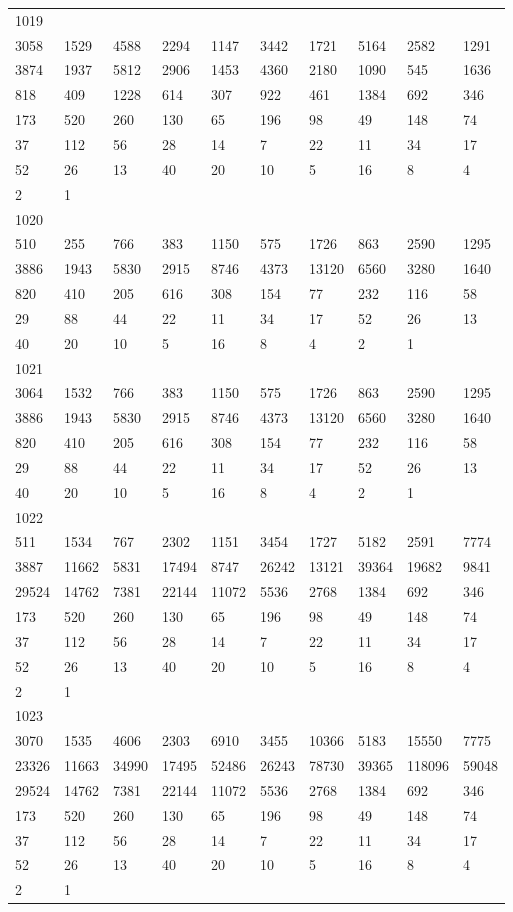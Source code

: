 \begin{longtable}{*{10}{l}}
1019&&&&&&&&&\\
3058& 1529& 4588& 2294& 1147& 3442& 1721& 5164& 2582& 1291\\
3874& 1937& 5812& 2906& 1453& 4360& 2180& 1090& 545& 1636\\
818& 409& 1228& 614& 307& 922& 461& 1384& 692& 346\\
173& 520& 260& 130& 65& 196& 98& 49& 148& 74\\
37& 112& 56& 28& 14& 7& 22& 11& 34& 17\\
52& 26& 13& 40& 20& 10& 5& 16& 8& 4\\
2& 1& \\

1020&&&&&&&&&\\
510& 255& 766& 383& 1150& 575& 1726& 863& 2590& 1295\\
3886& 1943& 5830& 2915& 8746& 4373& 13120& 6560& 3280& 1640\\
820& 410& 205& 616& 308& 154& 77& 232& 116& 58\\
29& 88& 44& 22& 11& 34& 17& 52& 26& 13\\
40& 20& 10& 5& 16& 8& 4& 2& 1& \\

1021&&&&&&&&&\\
3064& 1532& 766& 383& 1150& 575& 1726& 863& 2590& 1295\\
3886& 1943& 5830& 2915& 8746& 4373& 13120& 6560& 3280& 1640\\
820& 410& 205& 616& 308& 154& 77& 232& 116& 58\\
29& 88& 44& 22& 11& 34& 17& 52& 26& 13\\
40& 20& 10& 5& 16& 8& 4& 2& 1& \\

1022&&&&&&&&&\\
511& 1534& 767& 2302& 1151& 3454& 1727& 5182& 2591& 7774\\
3887& 11662& 5831& 17494& 8747& 26242& 13121& 39364& 19682& 9841\\
29524& 14762& 7381& 22144& 11072& 5536& 2768& 1384& 692& 346\\
173& 520& 260& 130& 65& 196& 98& 49& 148& 74\\
37& 112& 56& 28& 14& 7& 22& 11& 34& 17\\
52& 26& 13& 40& 20& 10& 5& 16& 8& 4\\
2& 1& \\

1023&&&&&&&&&\\
3070& 1535& 4606& 2303& 6910& 3455& 10366& 5183& 15550& 7775\\
23326& 11663& 34990& 17495& 52486& 26243& 78730& 39365& 118096& 59048\\
29524& 14762& 7381& 22144& 11072& 5536& 2768& 1384& 692& 346\\
173& 520& 260& 130& 65& 196& 98& 49& 148& 74\\
37& 112& 56& 28& 14& 7& 22& 11& 34& 17\\
52& 26& 13& 40& 20& 10& 5& 16& 8& 4\\
2& 1& \\


\end{longtable}
